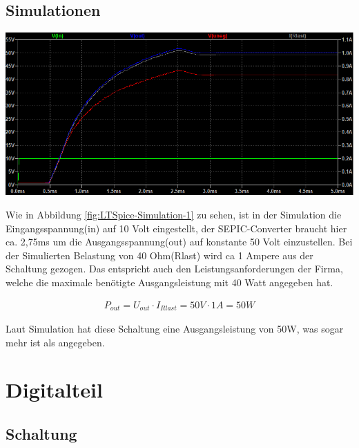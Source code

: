 \documentclass[paper=a4, 12pt]{scrreprt}
\begin{document}
		\subsection{Simulationen}
			\begin{adjustbox}{center,caption={Simulation der Schaltung Mittels LTSpice},label={fig:LTSpice-Simulation-1},nofloat=figure,vspace=\bigskipamount}
				\includegraphics[width=\textwidth]{img/LTSpice_Simulation_1.PNG}
			\end{adjustbox}
			Wie in Abbildung \ref{fig:LTSpice-Simulation-1} zu sehen, ist in der Simulation die Eingangsspannung(in) auf 10 Volt eingestellt, der SEPIC-Converter braucht hier ca. 2,75ms um die Ausgangsspannung(out) auf konstante 50 Volt einzustellen. Bei der Simulierten Belastung von 40 Ohm(Rlast) wird ca 1 Ampere aus der Schaltung gezogen. Das entspricht auch den Leistungsanforderungen der Firma, welche die maximale benötigte Ausgangsleistung mit 40 Watt angegeben hat. 
			
			\begin{align*} 
			P_{out} = U_{out} \cdot I_{Rlast} = 50V \cdot 1A = 50W
			\end{align*} 
			
			Laut Simulation hat diese Schaltung eine Ausgangsleistung von 50W, was sogar mehr ist als angegeben. 
	
	\section{Digitalteil}
		\subsection{Schaltung}


\appendix


\end{document}

